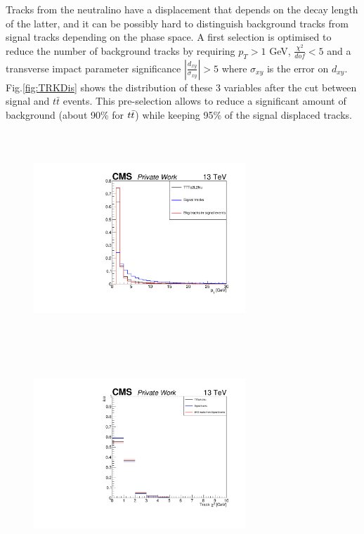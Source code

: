 \documentclass{cernatlasnote}
\begin{document}
        Tracks from the neutralino have a displacement that depends on the decay length of the latter, and it can be possibly hard to distinguish background tracks from signal tracks depending on the phase space. A first selection is optimised to reduce the number of background tracks by requiring $p_T > 1$ GeV, $\frac{\chi^2}{dof} < 5$ and a transverse impact parameter significance $|\frac{d_{xy}}{\sigma_{xy}}| > 5$ where  $\sigma_{xy}$ is the error on $d_{xy}$. Fig.\ref{fig:TRKDis} shows the distribution of these 3 variables after the cut between signal and $t\bar{t}$ events. This pre-selection allows to reduce a significant amount of background (about 90\% for $t\Bar{t}$) while keeping 95\% of the signal displaced tracks. \\

        \begin{figure}[ht]
        \centering
        \includegraphics[height=8cm, width=8cm, trim= 0cm 0cm 0cm 0cm,clip]{images/TRK/Pt_TT.pdf}
        \includegraphics[height=8cm, width=8cm, trim= 0cm 0cm 0cm 0cm,clip]{images/TRK/Track_chi2.pdf}

\end{figure}
\end{document}
